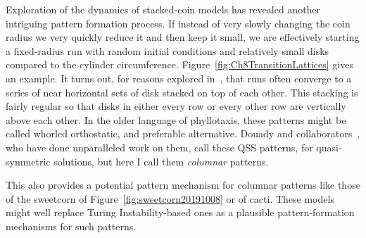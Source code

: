 Exploration of the dynamics of stacked-coin models has revealed another intriguing pattern formation process. If instead of very slowly changing the coin radius we very quickly reduce it and then keep it small, we are effectively starting a fixed-radius run with random initial conditions and relatively small disks compared to the cylinder circumference. Figure~\ref{fig:Ch8TransitionLattices} gives an example.
 It turns out, for reasons explored in~\autocite{goleFibonacciQuasisymmetricPhyllotaxis2016}, that
 runs often converge to a series of near horizontal sets of disk stacked on top of each other. This stacking is fairly regular so that disks in either every row or every other row are vertically above each other. In the older language of phyllotaxis, these patterns might be called whorled orthostatic, and  preferable alternative. Douady and collaborators~\cite{goleConvergenceDiskStacking2020}, who have done unparalleled work on them,  call these QSS patterns, for quasi-symmetric solutions, but here I call them \textit{columnar} patterns.

This also provides a potential pattern mechanism for columnar patterns like those of the sweetcorn of Figure~\ref{fig:sweetcorn20191008} or of cacti. These models might well replace Turing Instability-based ones as a plausible pattern-formation mechanisms for such patterns. 





